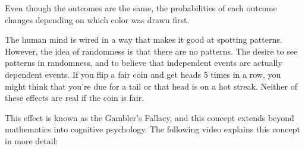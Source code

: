 \documentclass{ximera}
\begin{document}
\begin{image}
\end{image}

Even though the outcomes are the same, the probabilities of each outcome changes depending on which color was drawn first.

The human mind is wired in a way that makes it good at spotting patterns. However, the idea of randomness is that there are no patterns. The desire to see patterns in randomness, and to believe that independent events are actually dependent events. If you flip a fair coin and get heads 5 times in a row, you might think that you're due for a tail or that head is on a hot streak. Neither of these effects are real if the coin is fair.

This effect is known as the Gambler's Fallacy, and this concept extends beyond mathematics into cognitive psychology. The following video explains this concept in more detail: 
\end{document}

